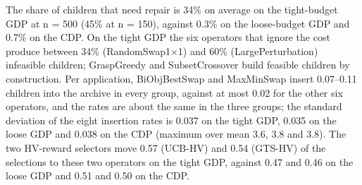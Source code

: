 \documentclass[final,3p,times,11pt,authoryear]{elsarticle}
\begin{document}
The share of children that need repair is 34\% on average on the tight-budget GDP at n = 500 (45\% at n = 150), against 0.3\% on the loose-budget GDP and 0.7\% on the CDP. On the tight GDP the six operators that ignore the cost produce between 34\% (RandomSwap1$\times$1) and 60\% (LargePerturbation) infeasible children; GraspGreedy and SubsetCrossover build feasible children by construction. Per application, BiObjBestSwap and MaxMinSwap insert 0.07--0.11 children into the archive in every group, against at most 0.02 for the other six operators, and the rates are about the same in the three groups; the standard deviation of the eight insertion rates is 0.037 on the tight GDP, 0.035 on the loose GDP and 0.038 on the CDP (maximum over mean 3.6, 3.8 and 3.8). The two HV-reward selectors move 0.57 (UCB-HV) and 0.54 (GTS-HV) of the selections to these two operators on the tight GDP, against 0.47 and 0.46 on the loose GDP and 0.51 and 0.50 on the CDP.

\begingroup
\scriptsize
\setlength{\bibsep}{0pt}


\endgroup
\end{document}

